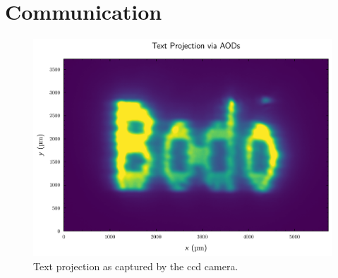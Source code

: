 \section{Communication}

\begin{figure}[htb]
  \centering
  \includegraphics[width=\textwidth]{../figure/intensity/projection/bodo.pdf}
  \caption{Text projection as captured by the \gls{ccd} camera.
  }\label{fig:setup_projection}
\end{figure}
